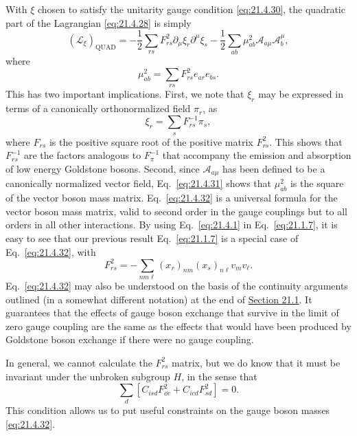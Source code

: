 With $\xi$ chosen to satisfy the unitarity gauge condition \eqref{eq:21.4.30}, the quadratic part of the Lagrangian \eqref{eq:21.4.28} is simply
\begin{equation}
(\mathcal L_\xi)_{\mathrm{QUAD}}
=-\frac{1}{2}\sum_{rs}F_{rs}^2
\partial_\mu\xi_r\partial^\mu\xi_s
-\frac{1}{2}\sum_{ab}
\mu_{ab}^2\mathcal A_{a\mu}\mathcal A_b^\mu,
\tag{21.4.31}\label{eq:21.4.31}
\end{equation}
where
\begin{equation}
\mu_{ab}^2
=\sum_{rs}F_{rs}^2 e_{a r}e_{b s}.
\tag{21.4.32}\label{eq:21.4.32}
\end{equation}
This has two important implications. First, we note that $\xi_r$ may be expressed in terms of a canonically orthonormalized field $\pi_r$, as
\begin{equation}
\xi_r=\sum_sF_{rs}^{-1}\pi_s,
\tag{21.4.33}\label{eq:21.4.33}
\end{equation}
where $F_{rs}$ is the positive square root of the positive matrix $F_{rs}^2$. This shows that $F_{rs}^{-1}$ are the factors analogous to $F_\pi^{-1}$ that accompany the emission and absorption of low energy Goldstone bosons. Second, since $\mathcal A_{a\mu}$ has been defined to be a canonically normalized vector field, Eq.~\eqref{eq:21.4.31} shows that $\mu_{ab}^2$ is the square of the vector boson mass matrix. Eq.~\eqref{eq:21.4.32} is a universal formula for the vector boson mass matrix, valid to second order in the gauge couplings but to all orders in all other interactions. By using Eq.~\eqref{eq:21.4.1} in Eq.~\eqref{eq:21.1.7}, it is easy to see that our previous result Eq.~\eqref{eq:21.1.7} is a special case of Eq.~\eqref{eq:21.4.32}, with
\[
F_{rs}^2=-\sum_{nm\ell}(x_r)_{nm}(x_s)_{n\ell}v_mv_\ell.
\]
Eq.~\eqref{eq:21.4.32} may also be understood on the basis of the continuity arguments outlined (in a somewhat different notation) at the end of \hyperref[sec:21.1]{Section 21.1}. It guarantees that the effects of gauge boson exchange that survive in the limit of zero gauge coupling are the same as the effects that would have been produced by Goldstone boson exchange if there were no gauge coupling.

In general, we cannot calculate the $F_{rs}^2$ matrix, but we do know that it must be invariant under the unbroken subgroup $H$, in the sense that
\[
\sum_d\left[C_{isd}F_{\dd c}^2+C_{icd}F_{sd}^2\right]=0.
\]
This condition allows us to put useful constraints on the gauge boson masses \eqref{eq:21.4.32}.

